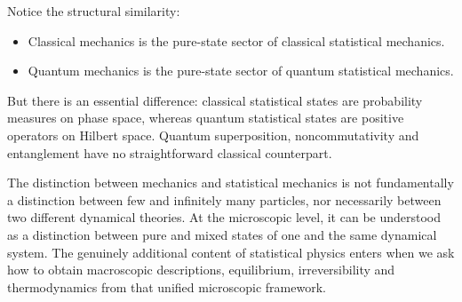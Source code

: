 Notice the structural similarity:
\begin{itemize}
   \item Classical mechanics is the pure-state sector of classical statistical mechanics.
   \item Quantum mechanics is the pure-state sector of quantum statistical mechanics.
\end{itemize}
But there is an essential difference: classical statistical states are
probability measures on phase space, whereas quantum statistical states are
positive operators on Hilbert space. Quantum superposition, noncommutativity
and entanglement have no straightforward classical counterpart.

 The distinction between mechanics and statistical mechanics is not
 fundamentally a distinction between few and infinitely many particles, nor
 necessarily between two different dynamical theories. At the microscopic
 level, it can be understood as a distinction between pure and mixed states of
 one and the same dynamical system.
The genuinely additional content of statistical physics enters when we ask how
to obtain macroscopic descriptions, equilibrium, irreversibility and
thermodynamics from that unified microscopic framework.

